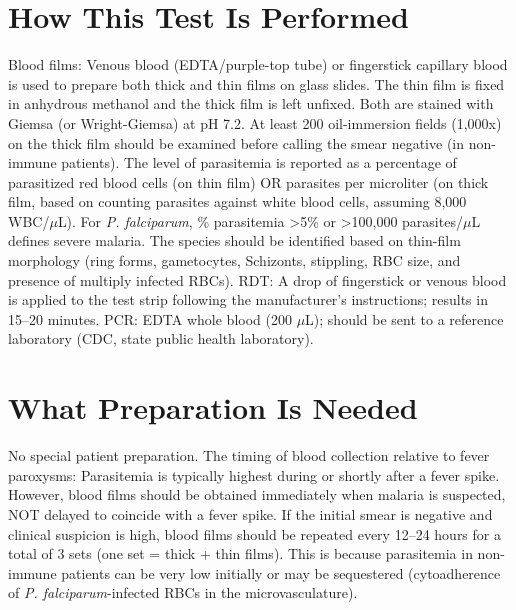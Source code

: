 \section*{How This Test Is Performed}
Blood films: Venous blood (EDTA/purple-top tube) or fingerstick capillary blood is used to prepare both thick and thin films on glass slides. The thin film is fixed in anhydrous methanol and the thick film is left unfixed. Both are stained with Giemsa (or Wright-Giemsa) at pH 7.2. At least 200 oil-immersion fields (1,000x) on the thick film should be examined before calling the smear negative (in non-immune patients). The level of parasitemia is reported as a percentage of parasitized red blood cells (on thin film) OR parasites per microliter (on thick film, based on counting parasites against white blood cells, assuming 8,000 WBC/$\mu$L). For \textit{P. falciparum}, \% parasitemia >5\% or >100,000 parasites/$\mu$L defines severe malaria. The species should be identified based on thin-film morphology (ring forms, gametocytes, Schizonts, stippling, RBC size, and presence of multiply infected RBCs). RDT: A drop of fingerstick or venous blood is applied to the test strip following the manufacturer's instructions; results in 15--20 minutes. PCR: EDTA whole blood (200 $\mu$L); should be sent to a reference laboratory (CDC, state public health laboratory).

\section*{What Preparation Is Needed}
No special patient preparation. The timing of blood collection relative to fever paroxysms: Parasitemia is typically highest during or shortly after a fever spike. However, blood films should be obtained immediately when malaria is suspected, NOT delayed to coincide with a fever spike. If the initial smear is negative and clinical suspicion is high, blood films should be repeated every 12--24 hours for a total of 3 sets (one set = thick + thin films). This is because parasitemia in non-immune patients can be very low initially or may be sequestered (cytoadherence of \textit{P. falciparum}-infected RBCs in the microvasculature).

